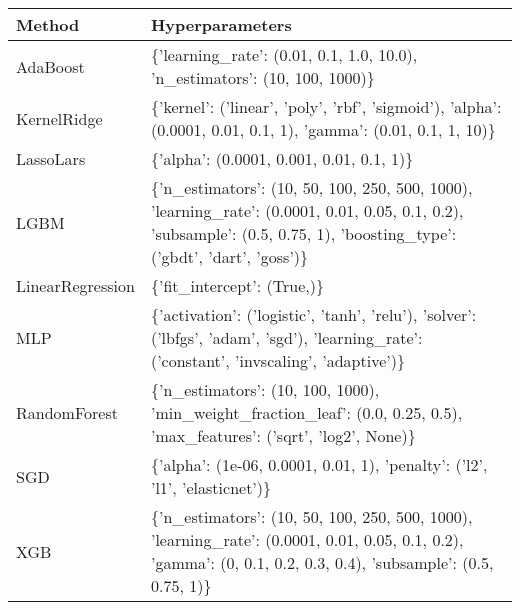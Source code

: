 \begin{tabular}{l p{37em}}
\toprule
          Method &                                                                                                                                                          Hyperparameters \\
\midrule
        AdaBoost &                                                                                               \{'learning\_rate': (0.01, 0.1, 1.0, 10.0), 'n\_estimators': (10, 100, 1000)\} \\
     KernelRidge &                                                           \{'kernel': ('linear', 'poly', 'rbf', 'sigmoid'), 'alpha': (0.0001, 0.01, 0.1, 1), 'gamma': (0.01, 0.1, 1, 10)\} \\
       LassoLars &                                                                                                                                 \{'alpha': (0.0001, 0.001, 0.01, 0.1, 1)\} \\
            LGBM & \{'n\_estimators': (10, 50, 100, 250, 500, 1000), 'learning\_rate': (0.0001, 0.01, 0.05, 0.1, 0.2), 'subsample': (0.5, 0.75, 1), 'boosting\_type': ('gbdt', 'dart', 'goss')\} \\
LinearRegression &                                                                                                                                               \{'fit\_intercept': (True,)\} \\
             MLP &                                \{'activation': ('logistic', 'tanh', 'relu'), 'solver': ('lbfgs', 'adam', 'sgd'), 'learning\_rate': ('constant', 'invscaling', 'adaptive')\} \\
    RandomForest &                                                  \{'n\_estimators': (10, 100, 1000), 'min\_weight\_fraction\_leaf': (0.0, 0.25, 0.5), 'max\_features': ('sqrt', 'log2', None)\} \\
             SGD &                                                                                               \{'alpha': (1e-06, 0.0001, 0.01, 1), 'penalty': ('l2', 'l1', 'elasticnet')\} \\
             XGB &          \{'n\_estimators': (10, 50, 100, 250, 500, 1000), 'learning\_rate': (0.0001, 0.01, 0.05, 0.1, 0.2), 'gamma': (0, 0.1, 0.2, 0.3, 0.4), 'subsample': (0.5, 0.75, 1)\} \\
\bottomrule
\end{tabular}
